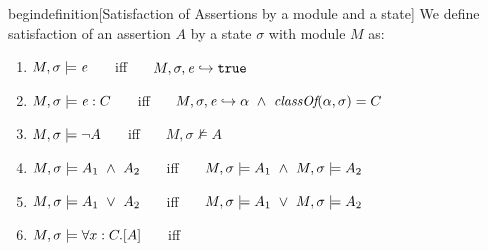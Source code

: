 begin{definition}[Satisfaction 
of Assertions by a module and a state] 
\label{def:chainmail-semantics}
We define satisfaction of an assertion $A$ by a %
state $\sigma$ with 
 module $M$ as:
\begin{enumerate}
\item
\label{cExpr}
$M , \sigma \models \mathit{e}$ \ \ \ iff \ \ \  $M, \sigma, \mathit{e} \hookrightarrow \texttt{true}$
\item
\label{cClass}
$M , \sigma \models {\mathit{e}} : C$ \ \ \ iff \ \ \  $\eval{M}{\sigma}{\sdOct{\re}}{\alpha}\   \wedge \ \class{\alpha} {\sigma}= C$
\item
$M , \sigma \models \neg A$ \ \ \ iff \ \ \  ${M},{\sigma}\nvDash{A}$
\item
$\satisfiesA{M}{\sigma}{A_1\ \wedge\ A_2}$ \ \ \ iff \ \ \  $\satisfiesA{M}{\sigma}{A_1} \   \wedge \ \satisfiesA{M}{\sigma}{A_2}$
\item
$\satisfiesA{M}{\sigma}{A_1\ \vee\ A_2}$ \ \ \ iff \ \ \  $\satisfiesA{M}{\sigma}{A_1}\   \vee \ \satisfiesA{M}{\sigma}{A_2}$

\item
\label{quant1}
$M , \sigma \models \forall x:C.[A]$ \ \ \ iff \ \ \  


\end{enumerate}
